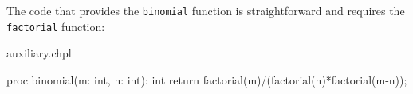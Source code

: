 The code that provides the \lstinline{binomial} function is straightforward 
and requires the \lstinline{factorial} function:
\begin{chapelsource}{auxiliary.chpl}
\begin{chapel}
proc binomial(m: int, n: int): int {
  return factorial(m)/(factorial(n)*factorial(m-n));
}
\end{chapel}
\end{chapelsource}


